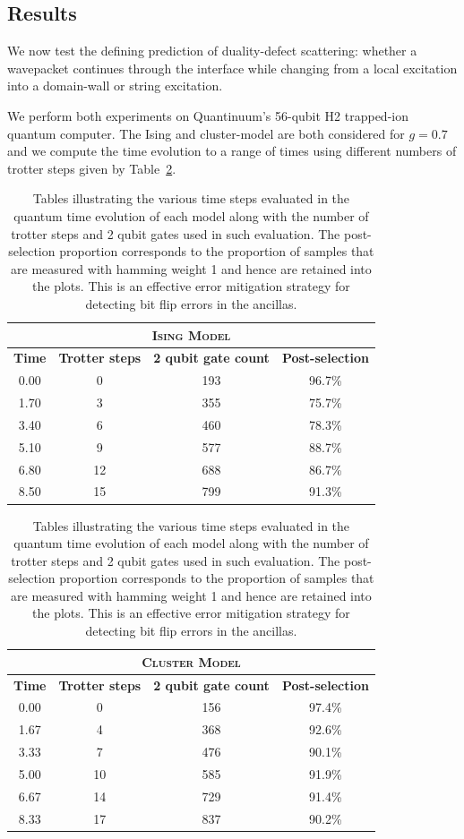 \documentclass[aps,floatfix,10pt,amssymb,amsfont,amsmath,superscriptaddress,float,nofootinbib,longbibliography,nobalancelastpage,twocolumn]{revtex4-2}
\begin{document}
\subsection{Results}
\label{section:results}
We now test the defining prediction of duality-defect scattering: whether a wavepacket continues through the interface while changing from a local excitation into a domain-wall or string excitation. 

We perform both experiments on Quantinuum's 56-qubit H2 trapped-ion quantum computer. The Ising and cluster-model are both considered for $g=0.7$ and we compute the time evolution to a range of times using different numbers of trotter steps given by Table~\ref{tab:trotter_steps}.
\begin{table}[htbp]
    \centering
    \begin{tabular}{|c|c|c|c|}
    \hline
        \multicolumn{4}{|c|}{\textsc{Ising Model}} \\\hline
         \textbf{Time}& \textbf{Trotter steps}&\textbf{2 qubit gate count}&\textbf{Post-selection}  \\\hline
         0.00&0&193&96.7\%\\\hline
         1.70&3&355&75.7\%\\\hline
         3.40&6&460&78.3\%\\\hline
         5.10&9&577&88.7\%\\\hline
         6.80&12&688&86.7\%\\\hline
         8.50&15&799&91.3\%\\\hline
    \end{tabular}\vspace{1cm}
    \begin{tabular}{|c|c|c|c|}
    \hline
     \multicolumn{4}{|c|}{\textsc{Cluster Model}} \\\hline
         \textbf{Time}& \textbf{Trotter steps}&\textbf{2 qubit gate count}&\textbf{Post-selection}  \\\hline
         0.00&0&156&97.4\%\\\hline
         1.67&4&368&92.6\%\\\hline
         3.33& 7&476&90.1\%\\\hline
         5.00&10&585&91.9\%\\\hline
         6.67&14&729&91.4\%\\\hline
         8.33&17&837&90.2\%\\\hline
    \end{tabular}
    \caption{Tables illustrating the various time steps evaluated in the quantum time evolution of each model along with the number of trotter steps and 2 qubit gates used in such evaluation. The post-selection proportion corresponds to the proportion of samples that are measured with hamming weight 1 and hence are retained into the plots. This is an effective error mitigation strategy for detecting bit flip errors in the ancillas.}
    \label{tab:trotter_steps}
\end{table}
\end{document}

